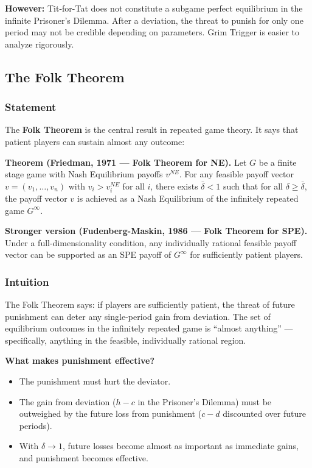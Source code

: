 \documentclass[hidelinks]{article}
\begin{document}
\textbf{However:} Tit-for-Tat does not constitute a subgame perfect equilibrium in the infinite Prisoner's Dilemma. After a deviation, the threat to punish for only one period may not be credible depending on parameters. Grim Trigger is easier to analyze rigorously.

\subsection{The Folk Theorem}

\subsubsection{Statement}

The \textbf{Folk Theorem} is the central result in repeated game theory. It says that patient players can sustain almost any outcome:

\textbf{Theorem (Friedman, 1971 — Folk Theorem for NE).} Let $G$ be a finite stage game with Nash Equilibrium payoffs $v^{NE}$. For any feasible payoff vector $v = (v_1, \ldots, v_n)$ with $v_i > v_i^{NE}$ for all $i$, there exists $\bar{\delta} < 1$ such that for all $\delta \geq \bar{\delta}$, the payoff vector $v$ is achieved as a Nash Equilibrium of the infinitely repeated game $G^\infty$.

\textbf{Stronger version (Fudenberg-Maskin, 1986 — Folk Theorem for SPE).} Under a full-dimensionality condition, any individually rational feasible payoff vector can be supported as an SPE payoff of $G^\infty$ for sufficiently patient players.

\subsubsection{Intuition}

The Folk Theorem says: if players are sufficiently patient, the threat of future punishment can deter any single-period gain from deviation. The set of equilibrium outcomes in the infinitely repeated game is ``almost anything'' — specifically, anything in the feasible, individually rational region.

\textbf{What makes punishment effective?}
\begin{itemize}
    \item The punishment must hurt the deviator.
    \item The gain from deviation ($h - c$ in the Prisoner's Dilemma) must be outweighed by the future loss from punishment ($c - d$ discounted over future periods).
    \item With $\delta \to 1$, future losses become almost as important as immediate gains, and punishment becomes effective.
\end{itemize}
\end{document}
